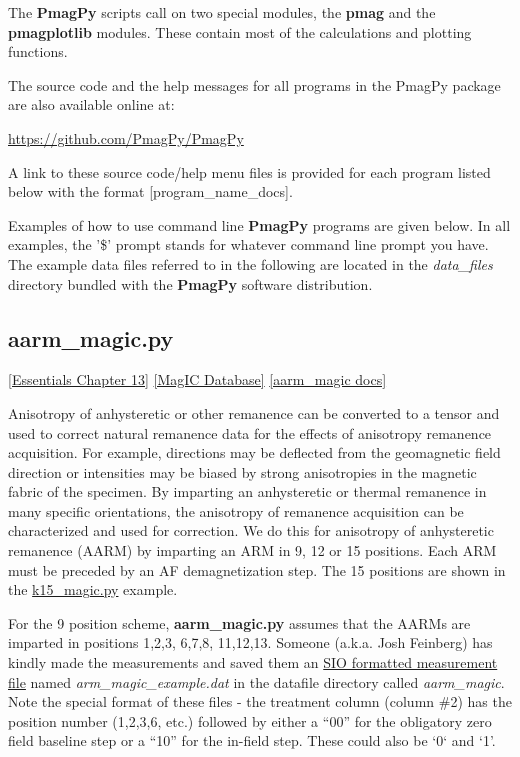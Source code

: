 \documentclass[11pt]{book}
\begin{document}
{ The {\bf PmagPy} scripts call on two special modules, the {\bf pmag} and the {\bf pmagplotlib} modules.  These contain most of the calculations and plotting functions.

 The source code and the help messages for all programs in the PmagPy package are also available online at:


 \url{https://github.com/PmagPy/PmagPy}

A link to these source code/help menu files is provided for each program listed below with the format [program\_name\_docs].

Examples of how to use command line {\bf PmagPy} programs are given below. In all examples, the '\$' prompt stands for whatever command line prompt you have. The example data files referred to in the following are located in the {\it data\_files} directory bundled with the {\bf PmagPy} software distribution.


\subsection{aarm\_magic.py}
 \href{http://earthref.org/MAGIC/books/Tauxe/Essentials/WebBook3ch13.html#ch13}{[Essentials Chapter 13]}
\href{#MagICDatabase}{[MagIC Database]}
\href{https://github.com/PmagPy/PmagPy/blob/master/programs/aarm_magic.py}{[aarm\_magic docs]}

Anisotropy of anhysteretic or other remanence can be converted to a tensor and used to correct natural remanence data for the effects of anisotropy remanence acquisition.  For example, directions may be deflected from the geomagnetic field direction or intensities may be biased by strong anisotropies in the magnetic fabric of the specimen.  By imparting an anhysteretic or thermal remanence in many specific orientations, the anisotropy of remanence acquisition can be characterized and used for correction.   We do this for anisotropy of anhysteretic remanence (AARM) by imparting an ARM in 9, 12  or 15 positions.  Each ARM must be preceded by an AF demagnetization step.    The 15 positions are shown in the \href{#k15_magic.py}{k15\_magic.py} example.




 For the 9 position scheme,  {\bf aarm\_magic.py} assumes that the AARMs are imparted in positions 1,2,3, 6,7,8, 11,12,13.    Someone (a.k.a. Josh Feinberg) has kindly made the measurements and saved them an \href{#sio_magic.py}{SIO formatted measurement file} named {\it arm\_magic\_example.dat} in the datafile directory called {\it aarm\_magic}.   Note the special format of these files - the treatment column (column \#2) has the position number (1,2,3,6, etc.) followed by either a ``00'' for the obligatory zero field baseline step or a ``10'' for the in-field step.  These could also be `0` and `1'.

}
\end{document}
